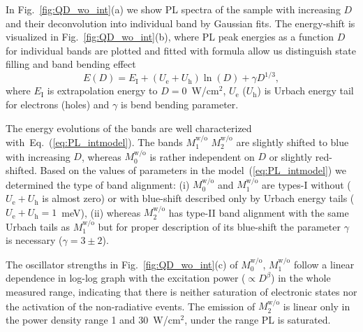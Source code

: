 In Fig.~\ref{fig:QD_wo_int}(a) we show PL spectra of the sample with increasing $D$ and their deconvolution into individual band by Gaussian fits. The energy-shift is visualized in Fig.~\ref{fig:QD_wo_int}(b), where PL peak energies as a function $D$ for individual bands are plotted and fitted with %
%
formula allow us distinguish state filling and band bending effect~\cite{Abramkin_blueshift_analytical}
\begin{equation}
E(D)=E_\mathrm{I}+\left(U_\mathrm{e}+U_\mathrm{h}\right) \ln\left(D \right)+\gamma D^{1/3}, \label{eq:PL_intmodel}
\end{equation}
%
where $E_\mathrm{I}$ is extrapolation energy to $D=0$~W/cm$^2$, $U_\mathrm{e}$ ($U_\mathrm{h}$) is Urbach energy tail for electrons (holes) and $\gamma$ is bend bending parameter.%

The energy evolutions of the bands are well characterized with~Eq.~(\ref{eq:PL_intmodel}). The bands $M_1^\mathrm{w/o}$ $M_2^\mathrm{w/o}$ are slightly shifted to blue with increasing $D$, whereas $M_0^\mathrm{w/o}$ is rather independent on $D$ or slightly red-shifted. Based on the values of parameters in the model~(\ref{eq:PL_intmodel}) we determined the type of band alignment: (i) $M_0^\mathrm{w/o}$ and $M_1^\mathrm{w/o}$ are types-I without ($U_\mathrm{e}+U_\mathrm{h}$ is almost zero) or with blue-shift described only by Urbach energy tails ($U_\mathrm{e}+U_\mathrm{h}=1$~meV), (ii) whereas $M_2^\mathrm{w/o}$ has type-II band alignment with the same Urbach tails as $M_1^\mathrm{w/o}$ but for proper description of its blue-shift the parameter $\gamma$ is necessary ($\gamma=3\pm2$).





The oscillator strengths in Fig.~\ref{fig:QD_wo_int}(c) of $M_0^\mathrm{w/o}$, $M_1^\mathrm{w/o}$ follow a linear dependence in log-log graph with the excitation power ($\propto D^\beta$) in the whole measured range, indicating that there is neither saturation of electronic states nor the activation of the non-radiative events. The emission of $M_2^\mathrm{w/o}$ is linear only in the power density range 1 and 30~W/cm$^2$, under the range PL is saturated.

